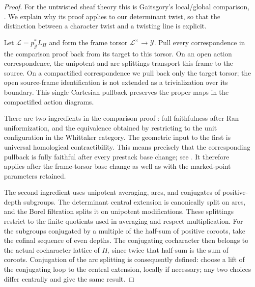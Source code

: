 \documentclass[11pt]{article}
\numberwithin{equation}{section}
\theoremstyle{definition}
\theoremstyle{remark}
\begin{document}
\begin{proof}
For the untwisted sheaf theory this is Gaitsgory's local/global comparison,
\cite[Theorems~5.5.2 and~7.2.3]{GaitsgoryWhit}. We explain why its proof
applies to our determinant twist, so that the distinction between a
character twist and a twisting line is explicit.

Let $\mathcal L=p_{\mathcal Y}^*L_H$ and form the frame torsor
$\mathcal L^\times\to\mathcal Y$. Pull every correspondence in the
comparison proof back from its target to this torsor. On an open
action correspondence, the unipotent and arc splittings transport this
frame to the source. On a compactified correspondence we pull back only
the target torsor; the open source-frame identification is not extended
as a trivialization over its boundary. This single Cartesian pullback
preserves the proper maps in the compactified action diagrams.

There are two ingredients in the comparison proof
\cite[Sections~6.1--6.6]{GaitsgoryWhit}: full faithfulness after Ran
uniformization, and the equivalence obtained by restricting to the unit
configuration in the Whittaker category. The geometric input to the first
is universal homological contractibility. This means precisely that the
corresponding pullback is fully faithful after every prestack base change;
see \cite[Appendix~A.1.8--A.1.11]{GaitsgorySemiInfiniteII}. It therefore
applies after the frame-torsor base change as well as with the marked-point
parameters retained.

The second ingredient uses unipotent averaging, arcs, and conjugates of
positive-depth subgroups. The determinant central extension is canonically
split on arcs, and the Borel filtration splits it on unipotent
modifications. These splittings restrict to the finite quotients used in
averaging and respect multiplication. For the subgroups conjugated by a
multiple of the half-sum of positive coroots, take the cofinal sequence of
even depths. The conjugating cocharacter then belongs to the actual
cocharacter lattice of $H$, since twice that half-sum is the sum of
coroots. Conjugation of the arc splitting is consequently defined: choose
a lift of the conjugating loop to the central extension, locally if
necessary; any two choices differ centrally and give the same result.


\end{proof}
\end{document}

